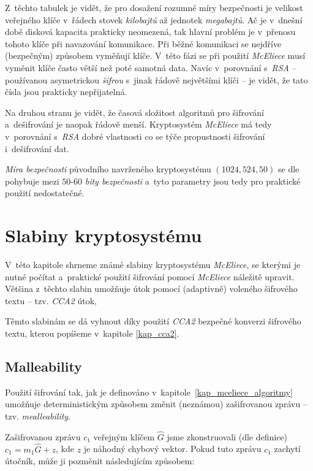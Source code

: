 \documentclass[thesis=M,czech,hidelinks]{FITthesis}[2012/06/26]
\newcommand{\0}{{\textcolor[gray]{0.75}{0}}}
\begin{document}
Z~těchto tabulek je vidět, že pro dosažení rozumné míry bezpečnosti je velikost
veřejného klíče v~řádech stovek \emph{kilobajtů} až jednotek \emph{megabajtů}.
Ač je v~dnešní době disková kapacita prakticky neomezená, tak hlavní problém je
v~přenosu tohoto klíče při navazování komunikace. Při běžné komunikaci se
nejdříve (bezpečným) způsobem vyměňují klíče. V~této fázi se při použití
\emph{McEliece} musí vyměnit klíče často větší než poté samotná data.
Navíc v~porovnání s~\emph{RSA} -- používanou asymetrickou \emph{šifrou} s~jinak
řádově největšími klíči -- je vidět, že tato čísla jsou prakticky nepřijatelná.

Na druhou stranu je vidět, že časová složitost algoritmů pro šifrování
a~dešifrování je naopak řádově menší. Kryptosystém \emph{McEliece} má tedy
v~porovnání s~\emph{RSA} dobré vlastnosti co se týče propustnosti šifrování
i~dešifrování dat.

\emph{Míra bezpečnosti} původního navrženého kryptosystému
$\left(1024,524,50\right)$ se dle~\cite{Canteaut,Repka} pohybuje mezi $50$-$60$
\emph{bity bezpečnosti} a~tyto parametry jsou tedy pro praktické použití
nedostatečné.



\section{Slabiny kryptosystému}\label{kap_slabiny}

V~této kapitole shrneme známé slabiny kryptosystému \emph{McEliece}, se
kterými je nutné počítat a~praktické použití šifrování pomocí \emph{McEliece}
náležitě upravit. Většina z~těchto slabin umožňuje útok pomocí (adaptivně)
voleného šifrového textu -- tzv. \emph{CCA2} útok,

Těmto slabinám se dá vyhnout díky použití \emph{CCA2} bezpečné konverzi
šifrového textu, kterou popíšeme v~kapitole \ref{kap_cca2}.


\subsection{Malleability}

Použití šifrování tak, jak je definováno v~kapitole~\ref{kap_mceliece_algoritmy}
umožňuje deterministickým způsobem změnit (neznámou) zašifrovanou zprávu -- tzv.
\emph{mealleability}.

Zašifrovanou zprávu $c_1$ veřejným klíčem $\hat{G}$ jsme zkonstruovali (dle
definice) $c_1 = m_1\hat{G} + z$, kde $z$ je náhodný chybový vektor. Pokud
tuto zprávu $c_1$ zachytí útočník, může ji pozměnit následujícím způsobem:
\end{document}
